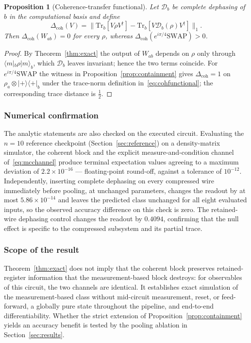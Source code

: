 \documentclass[conference]{IEEEtran}
\newtheorem{proposition}{Proposition}
\begin{document}
\begin{proposition}[Coherence-transfer functional]
\label{prop:coh}
Let $\mathcal{D}_b$ be complete dephasing of $b$ in the computational basis and define
\begin{equation}
\Delta_{\mathrm{coh}}(V) = \big\| \mathrm{Tr}_b[V \rho V^{\dagger}] - \mathrm{Tr}_b[V \mathcal{D}_b(\rho) V^{\dagger}] \big\|_1 .
\label{eq:cohfunctional}
\end{equation}
Then $\Delta_{\mathrm{coh}}(W_{ab}) = 0$ for every $\rho$, whereas $\Delta_{\mathrm{coh}}(e^{i\pi/4}\mathrm{SWAP}) > 0$.
\end{proposition}

\begin{proof}
By Theorem~\ref{thm:exact} the output of $W_{ab}$ depends on $\rho$ only through $\langle m|_b \rho |m\rangle_b$, which $\mathcal{D}_b$ leaves invariant; hence the two terms coincide. For $e^{i\pi/4}\mathrm{SWAP}$ the witness in Proposition~\ref{prop:containment} gives $\Delta_{\mathrm{coh}} = 1$ on $\rho_a \otimes |{+}\rangle\langle{+}|_b$ under the trace-norm definition in~\eqref{eq:cohfunctional}; the corresponding trace distance is $\tfrac{1}{2}$.
\end{proof}

\subsubsection{Numerical confirmation}
The analytic statements are also checked on the executed circuit. Evaluating the $n=10$ reference checkpoint (Section~\ref{sec:reference}) on a density-matrix simulator, the coherent block and the explicit measure-and-condition channel of~\eqref{eq:mcchannel} produce terminal expectation values agreeing to a maximum deviation of $2.2 \times 10^{-16}$ --- floating-point round-off, against a tolerance of $10^{-12}$. Independently, inserting complete dephasing on every compressed wire immediately before pooling, at unchanged parameters, changes the readout by at most $5.86 \times 10^{-14}$ and leaves the predicted class unchanged for all eight evaluated inputs, so the observed accuracy difference on this check is zero. The retained-wire dephasing control changes the readout by $0.4094$, confirming that the null effect is specific to the compressed subsystem and its partial trace.

\subsubsection{Scope of the result}
Theorem~\ref{thm:exact} does not imply that the coherent block preserves
retained-register information that the measurement-based block destroys: for
observables of this circuit, the two channels are identical. It establishes
exact simulation of the measurement-based class without mid-circuit
measurement, reset, or feed-forward, a globally pure state throughout the
pipeline, and end-to-end differentiability. Whether the strict
extension of Proposition~\ref{prop:containment} yields an accuracy benefit is
tested by the pooling ablation in Section~\ref{sec:results}.
\end{document}
